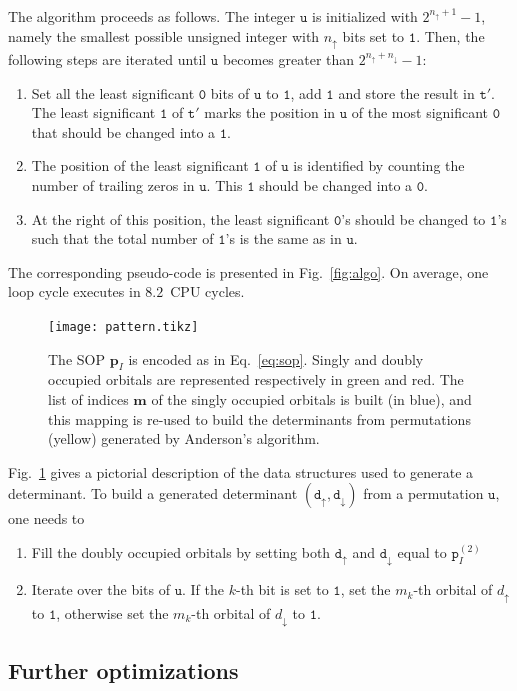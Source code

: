 \documentclass[aip,jcp,reprint,showkeys]{revtex4-1}
\newcommand{\tu}{\mathtt{u}}
\newcommand{\ttt}{\mathtt{t}}
\newcommand{\md}{\mathtt{d}}
\newcommand{\mpp}{\mathtt{p}}
\newcommand{\mpv}{\mathbf{p}}
\newcommand{\up}{\uparrow}
\newcommand{\dn}{\downarrow}
\newcommand{\one}{{\texttt{1}}}
\newcommand{\zero}{{\texttt{0}}}
\newcommand{\sop}{SOP}
\newcommand{\cpu}{CPU}
\begin{document}
The algorithm proceeds as follows. The integer $\tu$ is initialized with
$2^{n_\up+1}-1$, namely the smallest possible unsigned integer with $n_\up$
bits set to $\one$. 
Then, the following steps are iterated until $\tu$ becomes
greater than $2^{n_\up+n_\dn}-1$:
\begin{enumerate}
    \item Set all the least significant $\zero$ bits of $\tu$ to $\one$, add $\one$ and store the result in $\ttt'$. The least significant $\one$ of $\ttt'$ marks the position in $\tu$ of the most significant $\zero$ that should be changed into a $\one$.
    \item The position of the least significant $\one$ of $\tu$ is identified by counting the number of trailing zeros in $\tu$. This $\one$ should be changed into a $\zero$.
    \item At the right of this position, the least significant $\zero$'s should be changed to $\one$'s such that the total number of $\one$'s is the same as in $\tu$.
\end{enumerate}
The corresponding pseudo-code is presented in Fig.~\ref{fig:algo}. On average, one loop cycle executes in $8.2$~{\cpu} cycles.

\begin{figure}[t]
\texttt{[image: pattern.tikz]} 
\caption{The {\sop} $\mpv_I$ is encoded as in Eq.~\eqref{eq:sop}. Singly and doubly
occupied orbitals are represented respectively in green and red.
The list of indices $\mathbf{m}$ of the singly occupied orbitals is built (in blue), and this
mapping is re-used to build the determinants from permutations (yellow) generated by Anderson's algorithm.}
\label{fig:mapping}
\end{figure}

Fig.~\ref{fig:mapping} gives a pictorial description of the data structures used to generate a determinant.
To build a generated determinant $(\md_\up,\md_\dn)$ from a permutation $\tu$, one needs to
\begin{enumerate}
    \item Fill the doubly occupied orbitals by setting both $\md_\up$ and $\md_\dn$
          equal to $\mpp_I^{(2)}$
    \item Iterate over the bits of $\tu$. If the $k$-th bit is set to $\one$,
          set the $m_k$-th orbital of $d_\up$ to $\one$, otherwise set the $m_k$-th orbital
          of $d_\dn$ to $\one$.
\end{enumerate}

\subsection{Further optimizations}
\end{document}

